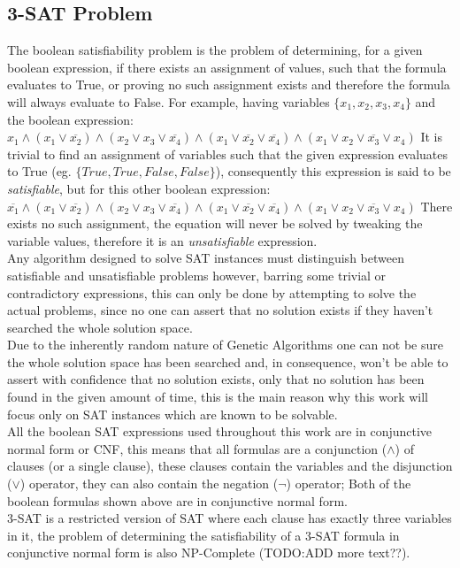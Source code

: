 \subsection{3-SAT Problem}

The boolean satisfiability problem is the problem of determining, for a given boolean expression, if there exists an assignment of values, such that the formula evaluates to True, or proving no such assignment exists and therefore the formula will always evaluate to False. For example, having variables $\{x_1, x_2, x_3, x_4\}$ and the boolean expression:
\bigbreak
$
 x_1 \land (x_1 \lor \overline{x_2}) \land (x_2 \lor x_3 \lor \overline{x_4}) \land (x_1 \lor \overline{x_2} \lor \overline{x_4}) \land (x_1 \lor x_2 \lor \overline{x_3} \lor x_4)
$
\bigbreak
It is trivial to find an assignment of variables such that the given expression evaluates to True (eg. $\{True, True, False, False\}$), consequently this expression is said to be \textit{satisfiable}, but for this other boolean expression:
\bigbreak
$
 \overline{x_1} \land (x_1 \lor \overline{x_2}) \land (x_2 \lor x_3 \lor \overline{x_4}) \land (x_1 \lor \overline{x_2} \lor \overline{x_4}) \land (x_1 \lor x_2 \lor \overline{x_3} \lor x_4)
$
\bigbreak There exists no such assignment, the equation will never be solved by tweaking the variable values, therefore it is an \textit{unsatisfiable} expression.
\\Any algorithm designed to solve SAT instances must distinguish between satisfiable and unsatisfiable problems however, barring some trivial or contradictory expressions, this can only be done by attempting to solve the actual problems, since no one can assert that no solution exists if they haven't searched the whole solution space.
\\Due to the inherently random nature of Genetic Algorithms one can not be sure the whole solution space has been searched and, in consequence, won't be able to assert with confidence that no solution exists, only that no solution has been found in the given amount of time, this is the main reason why this work will focus only on SAT instances which are known to be solvable.
\\All the boolean SAT expressions used throughout this work are in conjunctive normal form or CNF, this means that all formulas are a conjunction ($\wedge$) of clauses (or a single clause), these clauses contain the variables and the disjunction ($\vee$) operator, they can also contain the negation ($\neg$) operator; Both of the boolean formulas shown above are in conjunctive normal form.
\\3-SAT is a restricted version of SAT where each clause has exactly three variables in it, the problem of determining the satisfiability of a 3-SAT formula in conjunctive normal form is also NP-Complete \parencite{Karp2010} (TODO:ADD more text??).

